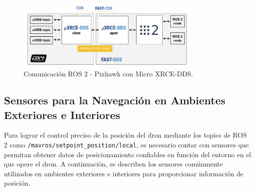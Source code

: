            \begin{figure}
                \centering
                \includegraphics[width=0.8\textwidth]{pictures/xrce_dds.png} 
                \caption{Comunicación ROS 2 - Pixhawk con Micro XRCE-DDS.}
                \label{fig:xrce_dds}
            \end{figure}
    
\subsection{Sensores para la Navegación en Ambientes Exteriores e Interiores}
    Para lograr el control preciso de la posición del dron mediante los topics de ROS 2 como \texttt{/mavros/setpoint\_position/local}, es necesario contar con sensores que permitan obtener datos de posicionamiento confiables en función del entorno en el que opere el dron. A continuación, se describen los sensores comúnmente utilizados en ambientes exteriores e interiores para proporcionar información de posición.
    
